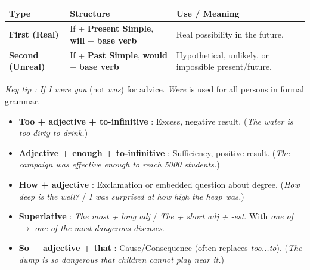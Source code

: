 \documentclass[11pt]{article}
\begin{document}
\begin{aretenir}
\begin{center}
\begin{tabularx}{\linewidth}{|l|X|X|}\hline
\textbf{Type} & \textbf{Structure} & \textbf{Use / Meaning} \\ \hline
\textbf{First (Real)} & If + \textbf{Present Simple}, \textbf{will} + \textbf{base verb} & Real possibility in the future. \\
\textbf{Second (Unreal)} & If + \textbf{Past Simple}, \textbf{would} + \textbf{base verb} & Hypothetical, unlikely, or impossible present/future. \\ \hline
\end{tabularx}
\end{center}
\textit{Key tip :} \emph{If I were you} (not \emph{was}) for advice. \emph{Were} is used for all persons in formal grammar.
\end{aretenir}

\begin{aretenir}
\begin{itemize}
\item \textbf{Too + adjective + to-infinitive} : Excess, negative result. (\emph{The water is too dirty to drink.})
\item \textbf{Adjective + enough + to-infinitive} : Sufficiency, positive result. (\emph{The campaign was effective enough to reach 5000 students.})
\item \textbf{How + adjective} : Exclamation or embedded question about degree. (\emph{How deep is the well?} / \emph{I was surprised at how high the heap was.})
\item \textbf{Superlative} : \emph{The most + long adj} / \emph{The + short adj + -est}. With \emph{one of} $\to$ \emph{one of the most dangerous diseases}.
\item \textbf{So + adjective + that} : Cause/Consequence (often replaces \emph{too...to}). (\emph{The dump is so dangerous that children cannot play near it.})
\end{itemize}
\end{aretenir}
\end{document}
